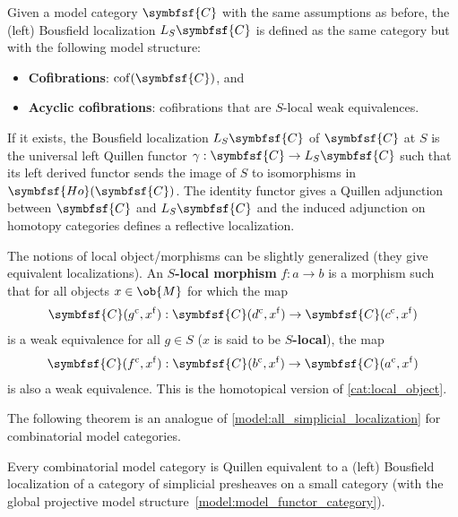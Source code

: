     \begin{construct}
        Given a model category $\symbfsf{C}$ with the same assumptions as before, the (left) Bousfield localization $L_S\symbfsf{C}$ is defined as the same category but with the following model structure:
        \begin{itemize}
            \item\textbf{Cofibrations}: $\mathrm{cof}(\symbfsf{C})$, and
            \item\textbf{Acyclic cofibrations}: cofibrations that are $S$-local weak equivalences.
        \end{itemize}
        If it exists, the Bousfield localization $L_S\symbfsf{C}$ of $\symbfsf{C}$ at $S$ is the universal left Quillen functor $\gamma:\symbfsf{C}\rightarrow L_S\symbfsf{C}$ such that its left derived functor sends the image of $S$ to isomorphisms in $\symbfsf{Ho}(\symbfsf{C})$. The identity functor gives a Quillen adjunction between $\symbfsf{C}$ and $L_S\symbfsf{C}$ and the induced adjunction on homotopy categories defines a reflective localization.
    \end{construct}
    \begin{remark}
        The notions of local object/morphisms can be slightly generalized (they give equivalent localizations). An \textbf{$S$-local morphism} $f:a\rightarrow b$ is a morphism such that for all objects $x\in\ob{M}$ for which the map
        \begin{gather}
            \symbfsf{C}(g^{\mathrm{c}},x^{\mathrm{f}}):\symbfsf{C}(d^{\mathrm{c}},x^{\mathrm{f}})\rightarrow\symbfsf{C}(c^{\mathrm{c}},x^{\mathrm{f}})
        \end{gather}
        is a weak equivalence for all $g\in S$ ($x$ is said to be \textbf{$S$-local}), the map
        \begin{gather}
            \symbfsf{C}(f^{\mathrm{c}},x^{\mathrm{f}}):\symbfsf{C}(b^{\mathrm{c}},x^{\mathrm{f}})\rightarrow\symbfsf{C}(a^{\mathrm{c}},x^{\mathrm{f}})
        \end{gather}
        is also a weak equivalence. This is the homotopical version of \cref{cat:local_object}.
    \end{remark}


    The following theorem is an analogue of \cref{model:all_simplicial_localization} for combinatorial model categories.
    \begin{theorem}[Dugger]\label{model:dugger}
        Every combinatorial model category is Quillen equivalent to a (left) Bousfield localization of a category of simplicial presheaves on a small category (with the global projective model structure~\ref{model:model_functor_category}).
    \end{theorem}


